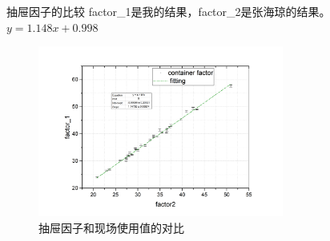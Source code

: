 \documentclass[11pt,compress,xcolor=x11names,UTF8]{beamer}
\begin{document}
\begin{frame}{抽屉因子的比较}
factor\_1是我的结果，factor\_2是张海琼的结果。$y=1.148x+0.998$
\vspace{-.05cm}
\begin{figure}
\includegraphics[width=0.72\textwidth]{drawerfactors} 
\caption{抽屉因子和现场使用值的对比}
\end{figure}
\end{frame}
\end{document}

